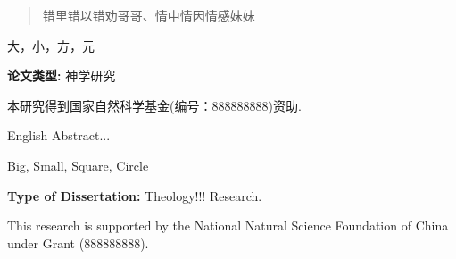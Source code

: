 \fancyhead[C]{\leftmark}
\fancyhead[CO]{\leftmark} %

\begin{abstract}
错里错以错劝哥哥、情中情因情感妹妹
\end{abstract}

\begin{keywords}
大，小，方，元
\end{keywords}

\vspace{\baselineskip} %
\noindent %
\textbf{\fontsize{12}{14}\selectfont 论文类型: }神学研究

\vspace{1.5\baselineskip} %
本研究得到国家自然科学基金(编号：888888888)资助.
\cleardoublepage


\fancyhead[C]{\leftmark}
\fancyhead[CO]{\leftmark} %

\begin{englishabstract}
English Abstract...
\end{englishabstract}

\begin{englishkeywords}
Big, Small, Square, Circle
\end{englishkeywords}

\vspace{\baselineskip} %
\noindent %
\textbf{\fontsize{12}{14}\selectfont Type of Dissertation: }Theology!!! Research.

\vspace{1.5\baselineskip} %
This research is supported by the National Natural Science Foundation of China under Grant (888888888).
\cleardoublepage
